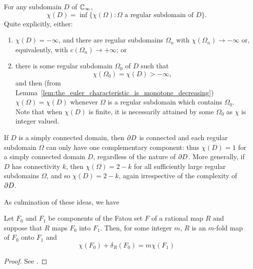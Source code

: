 \begin{definition}
    For any subdomain $D$ of $\mathbb{C}_\infty$,
    \begin{equation*}
        \chi(D) = \inf\{\chi(\Omega): \Omega \text{ a regular subdomain of } D\}.
    \end{equation*}
    Quite explicitly, either:
    \begin{enumerate}[label=(\arabic*)]
        \item $\chi(D) = -\infty$, and there are regular subdomains $\Omega_n$
        with $\chi(\Omega_n) \to -\infty$ or, equivalently, with $c(\Omega_n)
        \to +\infty$; or
        \item there is some regular subdomain $\Omega_0$ of $D$ such that
        \begin{equation*}
            \chi(\Omega_0) = \chi(D) > -\infty,
        \end{equation*}
        and then (from
        Lemma~\ref{lem:the_euler_characteristic_is_monotone_decreasing})
        $\chi(\Omega) = \chi(D)$ whenever $\Omega$ is a regular subdomain which
        contains $\Omega_0$. Note that when $\chi(D)$ is finite, it is
        necessarily attained by some $\Omega_0$ as $\chi$ is integer valued.
    \end{enumerate}
\end{definition}

If $D$ is a simply connected domain, then $\partial {D}$ is connected and each
regular subdomain $\Omega$ can only have one complementary component: thus
$\chi(D) = 1$ for a simply connected domain $D$, regardless of the nature of
$\partial {D}$. More generally, if $D$ has connectivity $k$, then $\chi(\Omega)
= 2 - k$ for all sufficiently large regular subdomains $\Omega$, and so $\chi(D)
= 2 - k$, again irrespective of the complexity of $\partial {D}$.

As culmination of these ideas, we have

\begin{theorem}
    \label{thm:Riemann_Hurwitz_relation_for_related_Fatou_components}
    Let $F_0$ and $F_1$ be components of the Fatou set $F$ of a rational map $R$
    and suppose that $R$ maps $F_0$ into $F_1$. Then, for some integer $m$, $R$
    is an $m$-fold map of $F_0$ onto $F_1$ and
    \begin{equation}
        \label{eq:Riemann_Hurwitz_relation_for_related_Fatou_components}
        \chi(F_0) + \delta_R(F_0) = m \chi(F_1)
    \end{equation}
\end{theorem}
\begin{proof}
    See \cite[92--93]{Beardon1991}.
\end{proof}

